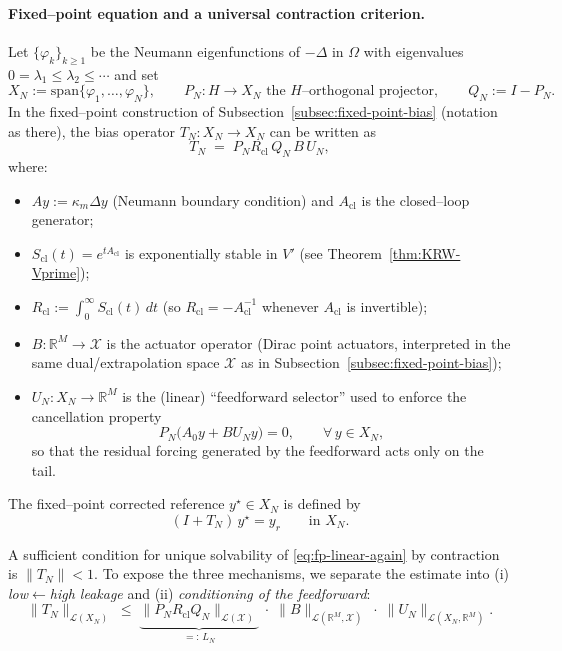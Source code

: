 \documentclass[11pt,a4paper]{article}
\numberwithin{equation}{section}
\theoremstyle{definition}
\newcommand{\1}{\mathbbm{1}}
\begin{document}
\paragraph{Fixed--point equation and a universal contraction criterion.}
Let $\{\varphi_k\}_{k\ge 1}$ be the Neumann eigenfunctions of $-\Delta$ in $\Omega$ with eigenvalues
$0=\lambda_1\le\lambda_2\le\cdots$ and set
\[
X_N:=\mathrm{span}\{\varphi_1,\dots,\varphi_N\},\qquad P_N:H\to X_N \text{ the }H\text{--orthogonal projector},\qquad Q_N:=I-P_N .
\]
In the fixed--point construction of Subsection~\ref{subsec:fixed-point-bias} (notation as there),
the bias operator $T_N:X_N\to X_N$ can be written as
\begin{equation}
\label{eq:TN-abstract}
T_N \;=\; P_N R_{\mathrm{cl}}\, Q_N\, B\,U_N ,
\end{equation}
where:
\begin{itemize}
\item $A y := \kappa_m \Delta y$ (Neumann boundary condition) and $A_{\mathrm{cl}}$ is the closed--loop generator;
\item $S_{\mathrm{cl}}(t)=e^{tA_{\mathrm{cl}}}$ is exponentially stable in $V'$ (see Theorem~\ref{thm:KRW-Vprime});
\item $R_{\mathrm{cl}}:=\displaystyle\int_0^\infty S_{\mathrm{cl}}(t)\,dt$ (so $R_{\mathrm{cl}}=-A_{\mathrm{cl}}^{-1}$ whenever $A_{\mathrm{cl}}$ is invertible);
\item $B:\mathbb{R}^M\to\mathcal{X}$ is the actuator operator (Dirac point actuators, interpreted in the same dual/extrapolation space $\mathcal{X}$ as in Subsection~\ref{subsec:fixed-point-bias});
\item $U_N:X_N\to\mathbb{R}^M$ is the (linear) ``feedforward selector'' used to enforce the cancellation property
\begin{equation}
\label{eq:cancellation-property}
P_N \bigl(A_0 y + B U_N y\bigr)=0,\qquad \forall\,y\in X_N,
\end{equation}
so that the residual forcing generated by the feedforward acts only on the tail.
\end{itemize}
The fixed--point corrected reference $y^\star\in X_N$ is defined by
\begin{equation}
\label{eq:fp-linear-again}
(I+T_N)\,y^\star = y_r \qquad \text{in }X_N.
\end{equation}

\medskip

\noindent
A sufficient condition for unique solvability of \eqref{eq:fp-linear-again} by contraction is $\|T_N\|<1$.
To expose the three mechanisms, we separate the estimate into (i) \emph{low$\leftarrow$high leakage} and
(ii) \emph{conditioning of the feedforward}:
\begin{equation}
\label{eq:TN-factorization}
\|T_N\|_{\mathcal{L}(X_N)}
\;\le\;
\underbrace{\|P_N R_{\mathrm{cl}}Q_N\|_{\mathcal{L}(\mathcal{X})}}_{=: \,L_N}
\;\cdot\;
\|B\|_{\mathcal{L}(\mathbb{R}^M,\mathcal{X})}
\;\cdot\;
\|U_N\|_{\mathcal{L}(X_N,\mathbb{R}^M)}.
\end{equation}
\end{document}
